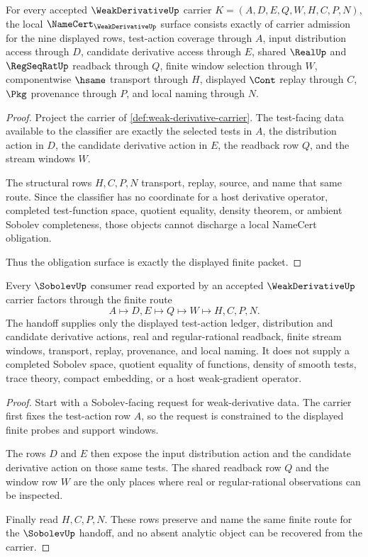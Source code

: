 \begin{theorem}
\label{thm:weak-derivative-namecert-obligations}
For every accepted $\WeakDerivativeUp$ carrier $K=(A,D,E,Q,W,H,C,P,N)$, the local $\NameCert_{\WeakDerivativeUp}$ surface consists exactly of carrier admission for the nine displayed rows, test-action coverage through $A$, input distribution access through $D$, candidate derivative access through $E$, shared $\RealUp$ and $\RegSeqRatUp$ readback through $Q$, finite window selection through $W$, componentwise $\hsame$ transport through $H$, displayed $\Cont$ replay through $C$, $\Pkg$ provenance through $P$, and local naming through $N$.
\end{theorem}
\begin{proof}
Project the carrier of \autoref{def:weak-derivative-carrier}. The test-facing data available to the classifier are exactly the selected tests in $A$, the distribution action in $D$, the candidate derivative action in $E$, the readback row $Q$, and the stream windows $W$.

The structural rows $H,C,P,N$ transport, replay, source, and name that same route. Since the classifier has no coordinate for a host derivative operator, completed test-function space, quotient equality, density theorem, or ambient Sobolev completeness, those objects cannot discharge a local NameCert obligation.

Thus the obligation surface is exactly the displayed finite packet.
\end{proof}

\begin{theorem}
\label{thm:weak-derivative-sobolev-handoff}
Every $\SobolevUp$ consumer read exported by an accepted $\WeakDerivativeUp$ carrier factors through the finite route
$$
A\longmapsto D,E\longmapsto Q\longmapsto W\longmapsto H,C,P,N.
$$
The handoff supplies only the displayed test-action ledger, distribution and candidate derivative actions, real and regular-rational readback, finite stream windows, transport, replay, provenance, and local naming. It does not supply a completed Sobolev space, quotient equality of functions, density of smooth tests, trace theory, compact embedding, or a host weak-gradient operator.
\end{theorem}
\begin{proof}
Start with a Sobolev-facing request for weak-derivative data. The carrier first fixes the test-action row $A$, so the request is constrained to the displayed finite probes and support windows.

The rows $D$ and $E$ then expose the input distribution action and the candidate derivative action on those same tests. The shared readback row $Q$ and the window row $W$ are the only places where real or regular-rational observations can be inspected.

Finally read $H,C,P,N$. These rows preserve and name the same finite route for the $\SobolevUp$ handoff, and no absent analytic object can be recovered from the carrier.
\end{proof}

